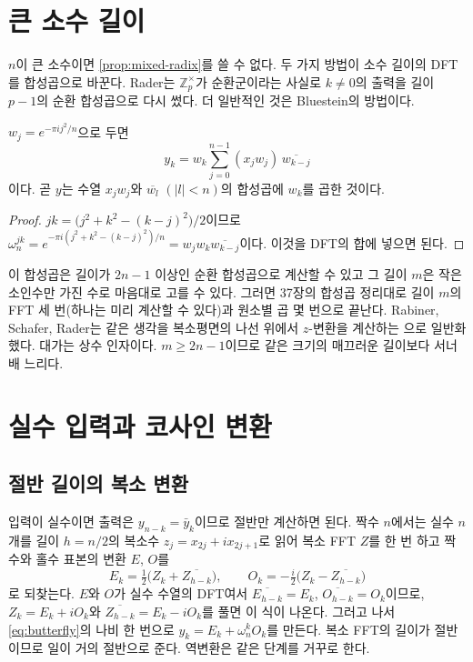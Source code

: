 \section{큰 소수 길이}
\label{sec:prime-length}

$n$이 큰 소수이면 \cref{prop:mixed-radix}를 쓸 수 없다. 두 가지 방법이 소수 길이의 DFT를 합성곱으로 바꾼다. Rader는 $\mathbb Z_p^\times$가 순환군이라는 사실로 $k\ne0$의 출력을 길이 $p-1$의 순환 합성곱으로 다시 썼다\cite{rader1968}. 더 일반적인 것은 Bluestein의 방법이다.

\begin{proposition}[Bluestein]
\label{prop:bluestein}
$w_j=e^{-\pi ij^2/n}$으로 두면
\[
y_k=w_k\sum_{j=0}^{n-1}(x_jw_j)\,\overline{w_{k-j}}
\]
이다. 곧 $y$는 수열 $x_jw_j$와 $\overline{w_l}$ $(|l|<n)$의 합성곱에 $w_k$를 곱한 것이다.
\end{proposition}

\begin{proof}
$jk=\bigl(j^2+k^2-(k-j)^2\bigr)/2$이므로 $\omega_n^{jk}=e^{-\pi i(j^2+k^2-(k-j)^2)/n}=w_jw_k\overline{w_{k-j}}$이다. 이것을 DFT의 합에 넣으면 된다.
\end{proof}

이 합성곱은 길이가 $2n-1$ 이상인 순환 합성곱으로 계산할 수 있고 그 길이 $m$은 작은 소인수만 가진 수로 마음대로 고를 수 있다. 그러면 37장의 합성곱 정리대로 길이 $m$의 FFT 세 번(하나는 미리 계산할 수 있다)과 원소별 곱 몇 번으로 끝난다. Rabiner, Schafer, Rader는 같은 생각을 복소평면의 나선 위에서 $z$-변환을 계산하는 으로 일반화했다\cite{bluestein1970,rabiner1969chirpz}. 대가는 상수 인자이다. $m\ge2n-1$이므로 같은 크기의 매끄러운 길이보다 서너 배 느리다.

\section{실수 입력과 코사인 변환}
\label{sec:real-fft}

\subsection{절반 길이의 복소 변환}

입력이 실수이면 출력은 $y_{n-k}=\bar y_k$이므로 절반만 계산하면 된다. 짝수 $n$에서는 실수 $n$개를 길이 $h=n/2$의 복소수 $z_j=x_{2j}+ix_{2j+1}$로 읽어 복소 FFT $Z$를 한 번 하고 짝수와 홀수 표본의 변환 $E$, $O$를
\[
E_k=\tfrac12\bigl(Z_k+\overline{Z_{h-k}}\bigr),\qquad O_k=-\tfrac i2\bigl(Z_k-\overline{Z_{h-k}}\bigr)
\]
로 되찾는다. $E$와 $O$가 실수 수열의 DFT여서 $\overline{E_{h-k}}=E_k$, $\overline{O_{h-k}}=O_k$이므로, $Z_k=E_k+iO_k$와 $\overline{Z_{h-k}}=E_k-iO_k$를 풀면 이 식이 나온다. 그러고 나서 \eqref{eq:butterfly}의 나비 한 번으로 $y_k=E_k+\omega_n^kO_k$를 만든다. 복소 FFT의 길이가 절반이므로 일이 거의 절반으로 준다. 역변환은 같은 단계를 거꾸로 한다.

